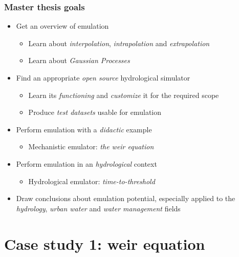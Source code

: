 \documentclass[xcolor=dvipsnames, USenglish]{beamer}  %
\begin{document}
  \begin{frame}
    \frametitle{Master thesis goals}
    \begin{itemize}
      \item Get an overview of emulation
      \begin{itemize}
        \item Learn about \emph{interpolation}, \emph{intrapolation} and \emph{extrapolation}
        \item Learn about \emph{Gaussian Processes}
      \end{itemize}
      \item Find an appropriate \emph{open source} hydrological simulator
      \begin{itemize}
        \item Learn its \emph{functioning} and \emph{customize} it for the required scope
        \item Produce \emph{test datasets} usable for emulation
      \end{itemize}
      \item Perform emulation with a \emph{didactic} example
      \begin{itemize}
        \item Mechanistic emulator: \emph{the weir equation}
      \end{itemize}
      \item Perform emulation in an \emph{hydrological} context
      \begin{itemize}
        \item Hydrological emulator: \emph{time-to-threshold}
      \end{itemize}
      \item Draw conclusions about emulation potential, especially applied to the \emph{hydrology},
            \emph{urban water} and \emph{water management} fields
    \end{itemize}
  \end{frame}




\section{Case study 1: weir equation}
\end{document}

